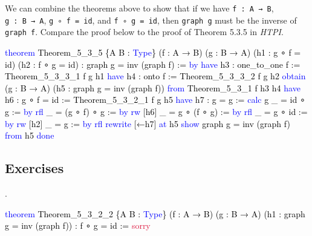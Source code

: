\documentclass[
  letterpaper,
  DIV=11,
  numbers=noendperiod]{scrreprt}
\newenvironment{Shaded}{\begin{snugshade}}{\end{snugshade}}
\newcommand{\ConstantTok}[1]{\textcolor[rgb]{0.56,0.35,0.01}{#1}}
\newcommand{\KeywordTok}[1]{\textcolor[rgb]{0.00,0.23,0.31}{#1}}
\newcommand{\NormalTok}[1]{\textcolor[rgb]{0.00,0.23,0.31}{#1}}
\renewcommand{\NormalTok}[1]{\textcolor[HTML]{000000}{#1}}
\renewcommand{\KeywordTok}[1]{\textcolor[HTML]{0000FF}{#1}}
\renewcommand{\ConstantTok}[1]{\textcolor[HTML]{DC143C}{#1}}
\newcommand{\nobreakShaded}{\renewenvironment{Shaded}
	{\begin{tcolorbox}[frame hidden, enhanced, interior hidden, boxrule=0pt,
		borderline west={3pt}{0pt}{shadecolor}, sharp corners]}
	{\end{tcolorbox}}}
\newenvironment{numex}[1]
	{\begin{minipage}[t]{0.04\textwidth}\vspace{8pt}{#1}.
		\end{minipage}\nobreakShaded\begin{minipage}[t]{0.96\textwidth}\vspace{0pt}}
	{\end{minipage}}
\theoremstyle{remark}
\begin{document}
We can combine the theorems above to show that if we have
\texttt{f\ :\ A\ →\ B}, \texttt{g\ :\ B\ →\ A}, \texttt{g\ ∘\ f\ =\ id},
and \texttt{f\ ∘\ g\ =\ id}, then \texttt{graph\ g} must be the inverse
of \texttt{graph\ f}. Compare the proof below to the proof of Theorem
5.3.5 in \emph{HTPI}.

\begin{Shaded}
\begin{Highlighting}[]
\KeywordTok{theorem}\NormalTok{ Theorem\_5\_3\_5 \{A B : }\KeywordTok{Type}\NormalTok{\} (f : A → B) (g : B → A)}
\NormalTok{    (h1 : g ∘ f = id) (h2 : f ∘ g = id) : graph g = inv (graph f) := }\KeywordTok{by}
  \KeywordTok{have}\NormalTok{ h3 : one\_to\_one f := Theorem\_5\_3\_3\_1 f g h1}
  \KeywordTok{have}\NormalTok{ h4 : onto f := Theorem\_5\_3\_3\_2 f g h2}
  \KeywordTok{obtain}\NormalTok{ (g\textquotesingle{} : B → A) (h5 : graph g\textquotesingle{} = inv (graph f))}
    \KeywordTok{from}\NormalTok{ Theorem\_5\_3\_1 f h3 h4}
  \KeywordTok{have}\NormalTok{ h6 : g\textquotesingle{} ∘ f = id := Theorem\_5\_3\_2\_1 f g\textquotesingle{} h5}
  \KeywordTok{have}\NormalTok{ h7 : g = g\textquotesingle{} :=}
    \KeywordTok{calc}\NormalTok{ g}
\NormalTok{      \_ = id ∘ g := }\KeywordTok{by} \KeywordTok{rfl}
\NormalTok{      \_ = (g\textquotesingle{} ∘ f) ∘ g := }\KeywordTok{by} \KeywordTok{rw}\NormalTok{ [h6]}
\NormalTok{      \_ = g\textquotesingle{} ∘ (f ∘ g) := }\KeywordTok{by} \KeywordTok{rfl}
\NormalTok{      \_ = g\textquotesingle{} ∘ id := }\KeywordTok{by} \KeywordTok{rw}\NormalTok{ [h2]}
\NormalTok{      \_ = g\textquotesingle{} := }\KeywordTok{by} \KeywordTok{rfl}
  \KeywordTok{rewrite}\NormalTok{ [←h7] }\KeywordTok{at}\NormalTok{ h5}
  \KeywordTok{show}\NormalTok{ graph g = inv (graph f) }\KeywordTok{from}\NormalTok{ h5}
  \KeywordTok{done}
\end{Highlighting}
\end{Shaded}

\hypertarget{exercises-12}{%
\subsection{Exercises}\label{exercises-12}}

\begin{numex}{1}

\begin{Shaded}
\begin{Highlighting}[]
\KeywordTok{theorem}\NormalTok{ Theorem\_5\_3\_2\_2 \{A B : }\KeywordTok{Type}\NormalTok{\} (f : A → B) (g : B → A)}
\NormalTok{    (h1 : graph g = inv (graph f)) : f ∘ g = id := }\ConstantTok{sorry}
\end{Highlighting}
\end{Shaded}

\end{numex}
\end{document}
